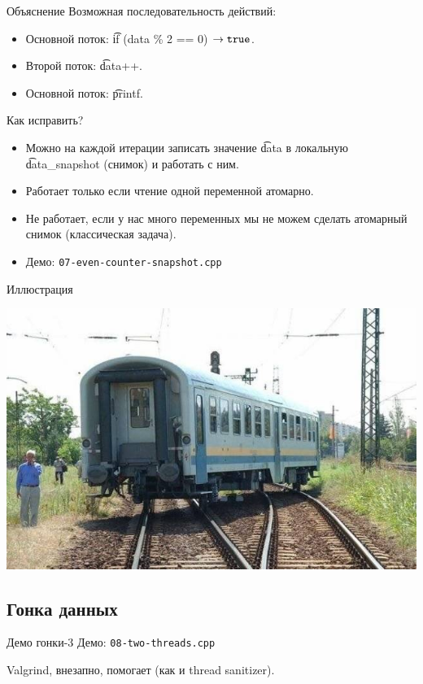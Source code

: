 \begin{frame}{Объяснение}
	Возможная последовательность действий:
	\begin{itemize}
		\item Основной поток: \t{if (data \% 2 == 0)} $\to \t{true}$.
		\item Второй поток: \t{data++}.
		\item Основной поток: \t{printf}.
	\end{itemize}
	Как исправить?
	\pause
	\begin{itemize}
		\item Можно на каждой итерации записать значение \t{data} в локальную \t{data\_snapshot} (снимок) и работать с ним.
		\item Работает только если чтение одной переменной атомарно.
		\item Не работает, если у нас много переменных мы не можем сделать атомарный снимок (классическая задача).
		\item Демо: \texttt{07-even-counter-snapshot.cpp}
	\end{itemize}
\end{frame}

\begin{frame}{Иллюстрация}
	\begin{center}
		\includegraphics[scale=0.6]{race-condition.jpg}
	\end{center}
\end{frame}

\subsection{Гонка данных}
\begin{frame}{Демо гонки-3}
	Демо: \texttt{08-two-threads.cpp}

	Valgrind, внезапно, помогает (как и thread sanitizer).
\end{frame}

